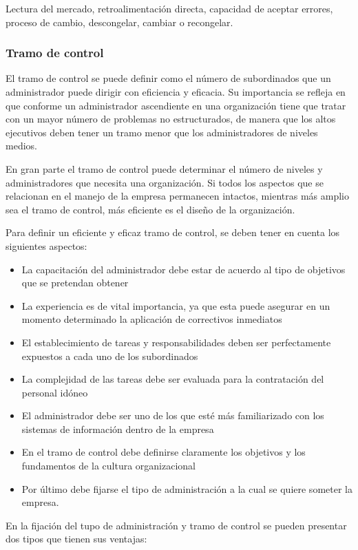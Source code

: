 Lectura del mercado, retroalimentación directa, capacidad de aceptar errores, proceso de cambio, descongelar, cambiar o recongelar.

\subsubsection{Tramo de control}
El tramo de control se puede definir como el número de subordinados que un administrador puede dirigir con eficiencia y eficacia. Su importancia se refleja en que conforme un administrador ascendiente en una organización tiene que tratar con un mayor número de problemas no estructurados, de manera que los altos ejecutivos deben tener un tramo menor que los administradores de niveles medios.

En gran parte el tramo de control puede determinar el número de niveles y administradores que necesita una organización. Si todos los aspectos que se relacionan en el manejo de la empresa permanecen intactos, mientras más amplio sea el tramo de control, más eficiente es el diseño de la organización.

Para definir un eficiente y eficaz tramo de control, se deben tener en cuenta los siguientes aspectos:
\begin{itemize}
    \item La capacitación del administrador debe estar de acuerdo al tipo de objetivos que se pretendan obtener
    \item La experiencia es de vital importancia, ya que esta puede asegurar en un momento determinado la aplicación de correctivos inmediatos
    \item El establecimiento de tareas y responsabilidades deben ser perfectamente expuestos a cada uno de los subordinados
    \item La complejidad de las tareas debe ser evaluada para la contratación del personal idóneo
    \item El administrador debe ser uno de los que esté más familiarizado con los sistemas de información dentro de la empresa
    \item En el tramo de control debe definirse claramente los objetivos y los fundamentos de la cultura organizacional
    \item Por último debe fijarse el tipo de administración a la cual se quiere someter la empresa.
\end{itemize}
En la fijación del tupo de administración y tramo de control se pueden presentar dos tipos que tienen sus ventajas:

